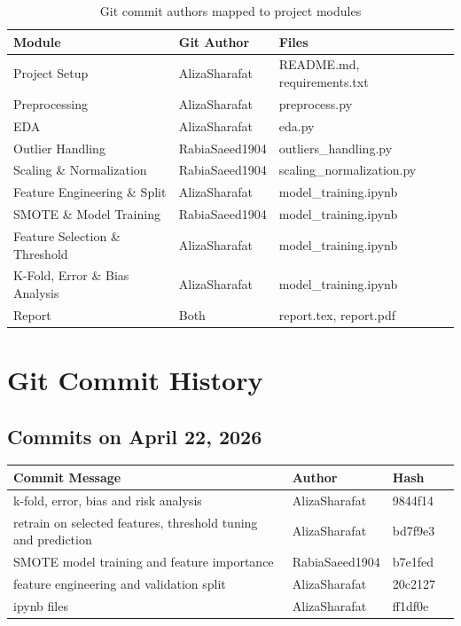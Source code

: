 \documentclass[12pt, a4paper]{article}
\begin{document}
\begin{table}[H]
\centering
\begin{tabular}{lll}
\toprule
\textbf{Module} & \textbf{Git Author} & \textbf{Files} \\
\midrule
Project Setup & AlizaSharafat & README.md, requirements.txt \\
Preprocessing & AlizaSharafat & preprocess.py \\
EDA & AlizaSharafat & eda.py \\
Outlier Handling & RabiaSaeed1904 & outliers\_handling.py \\
Scaling \& Normalization & RabiaSaeed1904 & scaling\_normalization.py \\
Feature Engineering \& Split & AlizaSharafat & model\_training.ipynb \\
SMOTE \& Model Training & RabiaSaeed1904 & model\_training.ipynb \\
Feature Selection \& Threshold & AlizaSharafat & model\_training.ipynb \\
K-Fold, Error \& Bias Analysis & AlizaSharafat & model\_training.ipynb \\
Report & Both & report.tex, report.pdf \\
\bottomrule
\end{tabular}
\caption{Git commit authors mapped to project modules}
\end{table}

\newpage

\section{Git Commit History}

\subsection*{Commits on April 22, 2026}

\begin{table}[H]
\centering
\small
\begin{tabular}{llll}
\toprule
\textbf{Commit Message} & \textbf{Author} & \textbf{Hash} \\
\midrule
k-fold, error, bias and risk analysis & AlizaSharafat & 9844f14 \\
retrain on selected features, threshold tuning and prediction & AlizaSharafat & bd7f9e3 \\
SMOTE model training and feature importance & RabiaSaeed1904 & b7e1fed \\
feature engineering and validation split & AlizaSharafat & 20c2127 \\
ipynb files & AlizaSharafat & ff1df0e \\
\bottomrule
\end{tabular}
\end{table}
\end{document}
